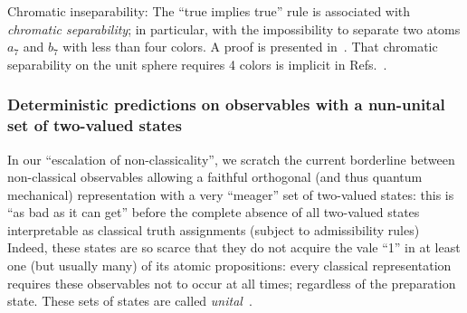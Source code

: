 Chromatic inseparability: The ``true implies true'' rule is associated with
{\em chromatic separability};
in particular, with the impossibility to separate two atoms $a_7$ and $b_7$
with less than four colors.
A proof is presented in~\cite[Figure~12.4]{svozil-2016-pu-book}.
That chromatic separability on the unit sphere requires 4 colors is implicit in Refs.~\cite{godsil-zaks,havlicek-2000}.




\subsubsection{Deterministic predictions on observables with a nun-unital set of two-valued states}
\label{2020-b-nonunital}

In our ``escalation of non-classicality'', we scratch the current borderline between non-classical observables allowing
a faithful orthogonal (and thus quantum mechanical) representation with a very ``meager'' set of two-valued states:
this is ``as bad as it can get'' before the complete absence of all two-valued states interpretable as classical truth assignments
(subject to admissibility rules)
Indeed, these states are so scarce that they do not acquire the vale ``1'' in at least one (but usually many) of its atomic
propositions: every classical representation requires these observables not to occur at all times; regardless of the preparation state.
These sets of states are called {\em unital}~\cite{wright:pent,kalmbach-86,tkadlec-96}.



